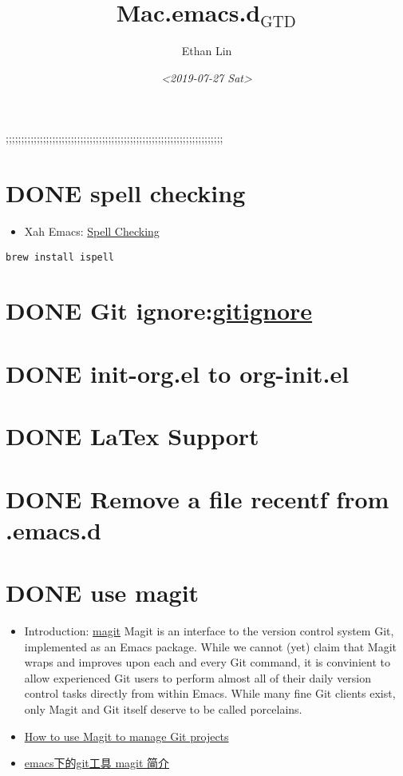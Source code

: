 \documentclass[11pt]{article}
\author{Ethan Lin}
\date{\textit{<2019-07-27 Sat>}}
\title{Mac.emacs.d\(_{\text{GTD}}\)}
\begin{document}
\maketitle
\tableofcontents

;;;;;;;;;;;;;;;;;;;;;;;;;;;;;;;;;;;;;;;;;;;;;;;;;;;;;;;;;;;;;;;;;;;;;;

\section{{\bfseries\sffamily DONE} spell checking}
\label{sec:org8dba1a0}
\begin{itemize}
\item Xah Emacs: \href{http://ergoemacs.org/emacs/emacs\_spell\_check.html}{Spell Checking}
\end{itemize}
\begin{verbatim}
brew install ispell
\end{verbatim}

\section{{\bfseries\sffamily DONE} Git ignore:\href{https://git-scm.com/docs/gitignore}{gitignore}}
\label{sec:orgd696670}
\section{{\bfseries\sffamily DONE} init-org.el to org-init.el}
\label{sec:orgb2cf611}
\section{{\bfseries\sffamily DONE} LaTex Support}
\label{sec:org6b38f8b}
\section{{\bfseries\sffamily DONE} Remove a file recentf from .emacs.d}
\label{sec:org0062164}
\section{{\bfseries\sffamily DONE} use magit}
\label{sec:org1e71e40}
\begin{itemize}
\item Introduction: \href{http://jixiuf.github.io/blog/000100-emacs-magit.html/}{magit}
Magit is an interface to the version control system Git, implemented as an Emacs package. While we cannot (yet) claim that Magit wraps and improves upon each and every Git command, it is convinient to allow experienced Git users to perform almost all of their daily version control tasks directly from within Emacs. While many fine Git clients exist, only Magit and Git itself deserve to be called porcelains.
\item \href{https://opensource.com/article/19/1/how-use-magit}{How to use Magit to manage Git projects}
\item \href{http://jixiuf.github.io/blog/000100-emacs-magit.html/}{emacs下的git工具 magit 简介}
\end{itemize}
\end{document}
